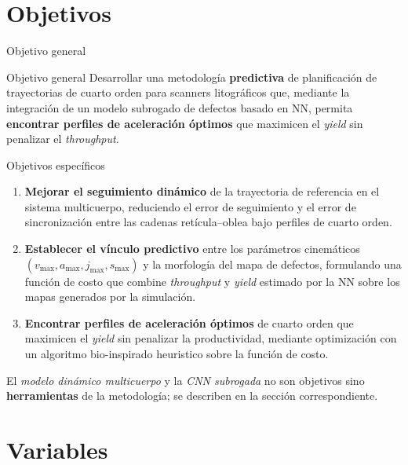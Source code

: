 \documentclass[en,16:9,navbarinline,bigfoot]{sdqbeamer}
\begin{document}
\section{Objetivos}

\begin{frame}{Objetivo general}
    \begin{purpleblock}{Objetivo general}
        Desarrollar una metodología \textbf{predictiva} de planificación de trayectorias de cuarto orden para scanners litográficos que, mediante la integración de un modelo subrogado de defectos basado en NN, permita \textbf{encontrar perfiles de aceleración óptimos} que maximicen el \textit{yield} sin penalizar el \textit{throughput}.
    \end{purpleblock}
\end{frame}

\begin{frame}{Objetivos específicos}
    \begin{enumerate}
        \item \textbf{Mejorar el seguimiento dinámico} de la trayectoria de referencia en el sistema multicuerpo, reduciendo el error de seguimiento y el error de sincronización entre las cadenas retícula--oblea bajo perfiles de cuarto orden.\\[-0.05cm]
        \item \textbf{Establecer el vínculo predictivo} entre los parámetros cinemáticos $(v_{\max}, a_{\max}, j_{\max}, s_{\max})$ y la morfología del mapa de defectos, formulando una función de costo que combine \textit{throughput} y \textit{yield} estimado por la NN sobre los mapas generados por la simulación.\\[-0.05cm]
        \item \textbf{Encontrar perfiles de aceleración óptimos} de cuarto orden que maximicen el \textit{yield} sin penalizar la productividad, mediante optimización con un algoritmo bio-inspirado heuristico sobre la función de costo.
    \end{enumerate}
    \vspace{0.15cm}
    \scriptsize El \emph{modelo dinámico multicuerpo} y la \emph{CNN subrogada} no son objetivos sino \textbf{herramientas} de la metodología; se describen en la sección correspondiente.
\end{frame}

\section{Variables}
\end{document}
